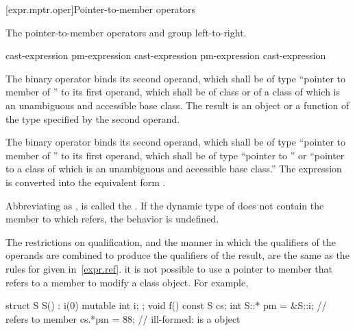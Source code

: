 [expr.mptr.oper]{Pointer-to-member operators}

\pnum
{}%
%
%
%
%
%
The pointer-to-member operators \tcode{->*} and  group
left-to-right.

\begin{bnf}
\br
    cast-expression\br
    pm-expression  cast-expression\br
    pm-expression \terminal{->*} cast-expression
\end{bnf}

\pnum
The binary operator  binds its second operand, which shall be
of type ``pointer to member of '' to its first operand, which shall be of
class  or of a class of which  is an unambiguous and
accessible base class. The result is an object or a function of the type
specified by the second operand.

\pnum
The binary operator \tcode{->*} binds its second operand, which shall be
of type ``pointer to member of '' to its first operand, which shall be of
type ``pointer to '' or ``pointer to a class of which 
is an unambiguous and accessible base class.''
The expression  is converted into the equivalent form
.

\pnum
Abbreviating  as , 
is called the .
If the dynamic type of  does not
contain the member to which
 refers, the behavior is undefined.

\pnum
The restrictions on qualification, and the manner in which
the qualifiers of the operands are combined to produce the
qualifiers of the result, are the same as the rules for
 given in~\ref{expr.ref}.
\enternote 
it is not possible to use a pointer to member that refers to a
 member to modify a  class object. For
example,

\begin{codeblock}
struct S {
  S() : i(0) { }
  mutable int i;
};
void f()
{
const S cs;
int S::* pm = &S::i;            //  refers to  member 
cs.*pm = 88;                    // ill-formed:  is a  object
}
\end{codeblock}
\exitnote 

